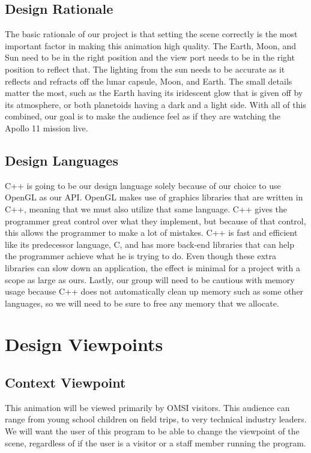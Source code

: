 \documentclass[onecolumn, draftclsnofoot,10pt, compsoc]{IEEEtran}
\begin{document}
    \subsection{Design Rationale}
	The basic rationale of our project is that setting the scene correctly is the most important factor in making this animation high quality. The Earth, Moon, and Sun need to be in the right position and the view port needs to be in the right position to reflect that. The lighting from the sun needs to be accurate as it reflects and refracts off the lunar capsule, Moon, and Earth. The small details matter the most, such as the Earth having its iridescent glow that is given off by its atmosphere, or both planetoids having a dark and a light side. With all of this combined, our goal is to make the audience feel as if they are watching the Apollo 11 mission live.
	
    \subsection{Design Languages}
	C++ is going to be our design language solely because of our choice to use OpenGL as our API. OpenGL makes use of graphics libraries that are written in C++, meaning that we must also utilize that same language. C++ gives the programmer great control over what they implement, but because of that control, this allows the programmer to make a lot of mistakes. C++ is fast and efficient like its predecessor language, C, and has more back-end libraries that can help the programmer achieve what he is trying to do. Even though these extra libraries can slow down an application, the effect is minimal for a project with a scope as large as ours. Lastly, our group will need to be cautious with memory usage because C++ does not automatically clean up memory such as some other languages, so we will need to be sure to free any memory that we allocate. 


\section{Design Viewpoints}

    \subsection{Context Viewpoint}
    
    This animation will be viewed primarily by OMSI visitors. This audience can range from young school children on field trips, to very technical industry leaders. We will want the user of this program to be able to change the viewpoint of the scene, regardless of if the user is a visitor or a staff member running the program.  
    
\end{document}
